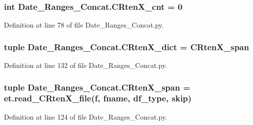 \subsubsection[{C\+Rten\+X\+\_\+cnt}]{\setlength{\rightskip}{0pt plus 5cm}int Date\+\_\+\+Ranges\+\_\+\+Concat.\+C\+Rten\+X\+\_\+cnt = 0}\label{namespace_date___ranges___concat_a7ef25cabc133407cacce6c54c47d4ef6}


Definition at line 78 of file Date\+\_\+\+Ranges\+\_\+\+Concat.\+py.

\hypertarget{namespace_date___ranges___concat_a52fc1e93f26878cf7dbed683ee91f254}{}
\subsubsection[{C\+Rten\+X\+\_\+dict}]{\setlength{\rightskip}{0pt plus 5cm}tuple Date\+\_\+\+Ranges\+\_\+\+Concat.\+C\+Rten\+X\+\_\+dict = {\bf C\+Rten\+X\+\_\+span}}\label{namespace_date___ranges___concat_a52fc1e93f26878cf7dbed683ee91f254}


Definition at line 132 of file Date\+\_\+\+Ranges\+\_\+\+Concat.\+py.

\hypertarget{namespace_date___ranges___concat_aada68102430e27b392077e44cee7ae5b}{}
\subsubsection[{C\+Rten\+X\+\_\+span}]{\setlength{\rightskip}{0pt plus 5cm}tuple Date\+\_\+\+Ranges\+\_\+\+Concat.\+C\+Rten\+X\+\_\+span = et.\+read\+\_\+\+C\+Rten\+X\+\_\+file({\bf f}, {\bf fname}, {\bf df\+\_\+type}, {\bf skip})}\label{namespace_date___ranges___concat_aada68102430e27b392077e44cee7ae5b}


Definition at line 124 of file Date\+\_\+\+Ranges\+\_\+\+Concat.\+py.

\hypertarget{namespace_date___ranges___concat_af8527316eb015c858bcbf22aa4a3ead8}{}
